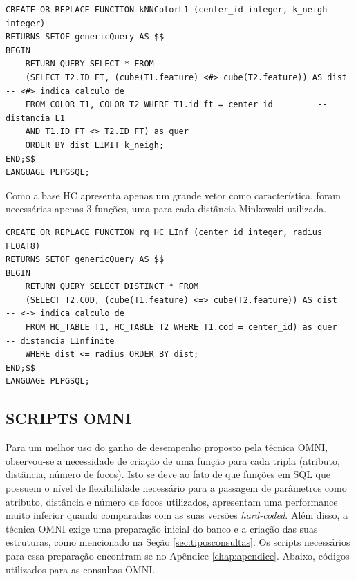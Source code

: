 \begin{lstlisting}[caption={Consulta k-vizinhos mais próximos sequêncial utilizando cor e distância city-block}, captionpos=t,basicstyle=\tiny]
CREATE OR REPLACE FUNCTION kNNColorL1 (center_id integer, k_neigh integer) 
RETURNS SETOF genericQuery AS $$
BEGIN
	RETURN QUERY SELECT * FROM 
	(SELECT T2.ID_FT, (cube(T1.feature) <#> cube(T2.feature)) AS dist  -- <#> indica calculo de 
	FROM COLOR T1, COLOR T2 WHERE T1.id_ft = center_id 		   -- distancia L1
	AND T1.ID_FT <> T2.ID_FT) as quer 
	ORDER BY dist LIMIT k_neigh;	
END;$$
LANGUAGE PLPGSQL;
\end{lstlisting}

Como a base HC apresenta apenas um grande vetor como característica, foram necessárias apenas 3 funções, uma para cada distância Minkowski utilizada.

\begin{lstlisting}[caption={Consulta por abrangência sequêncial utilizando distância Chebyshev para a base HC}, captionpos=t, basicstyle=\tiny]
CREATE OR REPLACE FUNCTION rq_HC_LInf (center_id integer, radius FLOAT8) 
RETURNS SETOF genericQuery AS $$
BEGIN
	RETURN QUERY SELECT DISTINCT * FROM 
	(SELECT T2.COD, (cube(T1.feature) <=> cube(T2.feature)) AS dist   -- <-> indica calculo de
	FROM HC_TABLE T1, HC_TABLE T2 WHERE T1.cod = center_id) as quer   -- distancia LInfinite
	WHERE dist <= radius ORDER BY dist;		
END;$$
LANGUAGE PLPGSQL;
\end{lstlisting}

\subsection{SCRIPTS OMNI}
Para um melhor uso do ganho de desempenho proposto pela técnica OMNI, observou-se a necessidade de criação de uma função para cada tripla (atributo, distância, número de focos). Isto se deve ao fato de que funções em SQL que possuem
o nível de flexibilidade necessário para a passagem de parâmetros como atributo, distância e número de focos utilizados, apresentam uma performance muito inferior quando comparadas com as suas versões \textit{hard-coded}. Além disso, a técnica OMNI
exige uma preparação inicial do banco e a criação das suas estruturas, como mencionado na Seção \ref{sec:tiposconsultas}. Os scripts necessários para essa preparação encontram-se no Apêndice \ref{chap:apendice}. Abaixo, códigos utilizados para 
as consultas OMNI.

